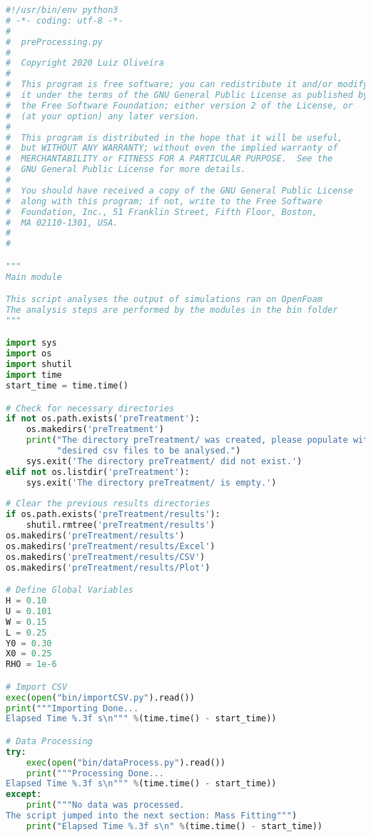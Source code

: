 \begin{lstlisting}[language=python]
#!/usr/bin/env python3
# -*- coding: utf-8 -*-
#
#  preProcessing.py
#  
#  Copyright 2020 Luiz Oliveira
#  
#  This program is free software; you can redistribute it and/or modify
#  it under the terms of the GNU General Public License as published by
#  the Free Software Foundation; either version 2 of the License, or
#  (at your option) any later version.
#  
#  This program is distributed in the hope that it will be useful,
#  but WITHOUT ANY WARRANTY; without even the implied warranty of
#  MERCHANTABILITY or FITNESS FOR A PARTICULAR PURPOSE.  See the
#  GNU General Public License for more details.
#  
#  You should have received a copy of the GNU General Public License
#  along with this program; if not, write to the Free Software
#  Foundation, Inc., 51 Franklin Street, Fifth Floor, Boston,
#  MA 02110-1301, USA.
#  
#  

"""
Main module

This script analyses the output of simulations ran on OpenFoam
The analysis steps are performed by the modules in the bin folder
"""

import sys
import os
import shutil
import time
start_time = time.time()

# Check for necessary directories
if not os.path.exists('preTreatment'):
    os.makedirs('preTreatment')
    print("The directory preTreatment/ was created, please populate with the "
          "desired csv files to be analysed.")
    sys.exit('The directory preTreatment/ did not exist.')
elif not os.listdir('preTreatment'):
    sys.exit('The directory preTreatment/ is empty.')
    
# Clear the previous results directories
if os.path.exists('preTreatment/results'):
    shutil.rmtree('preTreatment/results')
os.makedirs('preTreatment/results')
os.makedirs('preTreatment/results/Excel')
os.makedirs('preTreatment/results/CSV')
os.makedirs('preTreatment/results/Plot')

# Define Global Variables
H = 0.10
U = 0.101
W = 0.15
L = 0.25
Y0 = 0.30
X0 = 0.25
RHO = 1e-6

# Import CSV
exec(open("bin/importCSV.py").read())
print("""Importing Done...
Elapsed Time %.3f s\n""" %(time.time() - start_time))

# Data Processing
try:
    exec(open("bin/dataProcess.py").read())
    print("""Processing Done...
Elapsed Time %.3f s\n""" %(time.time() - start_time))
except:
    print("""No data was processed.
The script jumped into the next section: Mass Fitting""")
    print("Elapsed Time %.3f s\n" %(time.time() - start_time))


\end{lstlisting}
